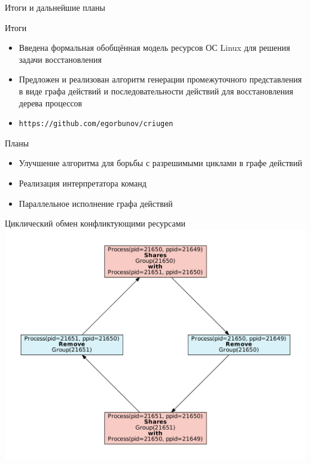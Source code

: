 \begin{frame}{Итоги и дальнейшие планы}
\begin{block}{Итоги}
\begin{itemize}
\item Введена формальная обобщённая модель ресурсов ОС Linux для решения задачи восстановления
\item Предложен и реализован алгоритм генерации промежуточного представления в виде графа действий и последовательности действий для восстановления дерева процессов
\item \texttt{https://github.com/egorbunov/criugen}
\end{itemize}
\end{block}

\begin{block}{Планы}
\begin{itemize}
\item Улучшение алгоритма для борьбы с разрешимыми циклами в графе действий
\item Реализация интерпретатора команд
\item Параллельное исполнение графа действий
\end{itemize}
\end{block}

\end{frame}


\backupbegin

\appendix


\begin{frame}{Циклический обмен конфликтующими ресурсами}
\centering
\includegraphics[scale=0.4]{fig/badexcycle.pdf}
\end{frame}

